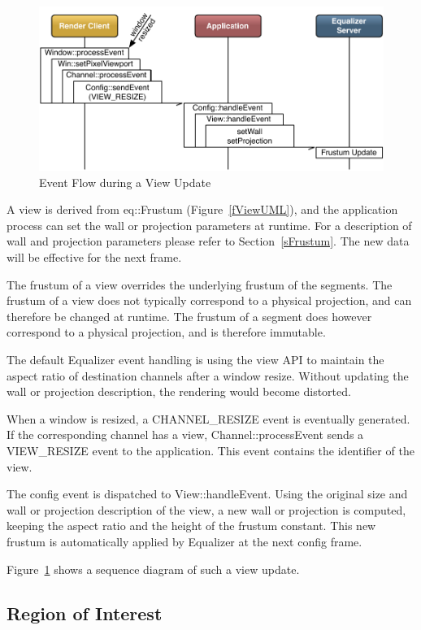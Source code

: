 \documentclass[10pt,a4]{scrartcl}
\newcommand{\fig}[1]{Figure~\ref{#1}}
\newcommand{\sref}[1]{Section~\ref{#1}}
\begin{document}
\begin{figure}
  \includegraphics[width=.618\textwidth]{images/viewUpdate.pdf}
  {\caption{\label{fViewUpdate}Event Flow during a View Update}}
\end{figure}
A view is derived from \textsf{eq::Frustum} (\fig{fViewUML}), and the
application process can set the wall or projection parameters at
runtime. For a description of wall and projection parameters please refer
to \sref{sFrustum}. The new data will be effective for the next frame.

The frustum of a view overrides the underlying frustum of the
segments. The frustum of a view does not typically correspond to a
physical projection, and can therefore be changed at runtime. The
frustum of a segment does however correspond to a physical projection,
and is therefore immutable.

The default Equalizer event handling is using the view API to maintain
the aspect ratio of destination channels after a window resize. Without
updating the wall or projection description, the rendering would become
distorted.

When a window is resized, a \textsf{CHANNEL\_RESIZE} event is eventually
generated. If the corresponding channel has a view,
\textsf{Channel::processEvent} sends a \textsf{VIEW\_RESIZE} event to
the application. This event contains the identifier of the view. 

The config event is dispatched to \textsf{View::handleEvent}. Using the original
size and wall or projection description of the view, a new wall or projection is
computed, keeping the aspect ratio and the height of the frustum constant. This
new frustum is automatically applied by Equalizer at the next config frame.

\fig{fViewUpdate} shows a sequence diagram of such a view update.


\subsection{\label{sROI}Region of Interest}
\end{document}
